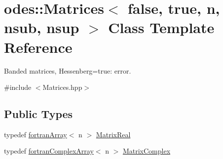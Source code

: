 \hypertarget{classodes_1_1Matrices_3_01false_00_01true_00_01n_00_01nsub_00_01nsup_01_4}{}\section{odes\+:\+:Matrices$<$ false, true, n, nsub, nsup $>$ Class Template Reference}
\label{classodes_1_1Matrices_3_01false_00_01true_00_01n_00_01nsub_00_01nsup_01_4}


Banded matrices, Hessenberg=true\+: error.  




{\ttfamily \#include $<$Matrices.\+hpp$>$}

\subsection*{Public Types}
\begin{DoxyCompactItemize}
\item 
typedef \hyperlink{classodes_1_1fortranArray}{fortran\+Array}$<$ n $>$ \hyperlink{classodes_1_1Matrices_3_01false_00_01true_00_01n_00_01nsub_00_01nsup_01_4_a63af1e92e4c06d6986909d7af6a9c0b9}{Matrix\+Real}
\item 
typedef \hyperlink{classodes_1_1fortranComplexArray}{fortran\+Complex\+Array}$<$ n $>$ \hyperlink{classodes_1_1Matrices_3_01false_00_01true_00_01n_00_01nsub_00_01nsup_01_4_ab1d809758e20fa3ef210700989a47fa0}{Matrix\+Complex}
\end{DoxyCompactItemize}
